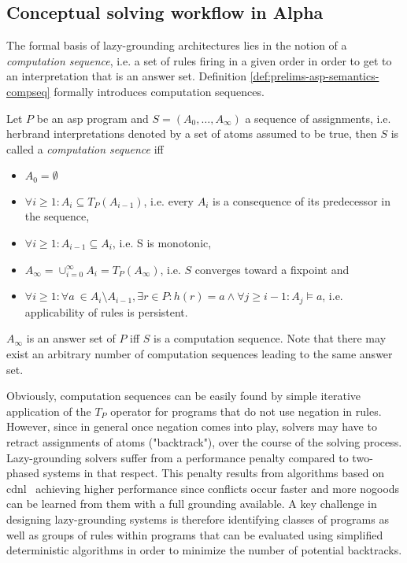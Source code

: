 \subsection{Conceptual solving workflow in Alpha}

The formal basis of lazy-grounding architectures lies in the notion of a \emph{computation sequence}, i.e. a set of rules firing in a given order in order to get to an interpretation that is an answer set. Definition \ref{def:prelims-asp-semantics-compseq} formally introduces computation sequences.

\begin{definition}
\label{def:prelims-asp-semantics-compseq}
Let $P$ be an \gls{asp} program and $S = (A_0,\ldots,A_{\infty})$ a sequence of assignments, i.e. herbrand interpretations denoted by a set of atoms assumed to be true, then $S$ is called a \emph{computation sequence} iff
\begin{itemize}
	\item $A_0 = \emptyset$
	\item $\forall i \geq 1: A_i \subseteq T_P(A_{i - 1})$, i.e. every $A_i$ is a consequence of its predecessor in the sequence,
	\item $\forall i \geq 1: A_{i - 1} \subseteq A_{i}$, i.e. S is monotonic,
	\item $A_{\infty} = \cup^{\infty}_{i = 0} A_i = T_P(A_{\infty})$, i.e. $S$ converges toward a fixpoint and
	\item $\forall i \geq 1: \forall a \ \in A_i \setminus A_{i - 1}, \exists r \in P: h(r) = a \land \forall j \geq i - 1: A_j \models a$, i.e. applicability of rules is persistent.
\end{itemize}
$A_{\infty}$ is an answer set of $P$ iff $S$ is a computation sequence. Note that there may exist an arbitrary number of computation sequences leading to the same answer set.
\end{definition}

Obviously, computation sequences can be easily found by simple iterative application of the $T_P$ operator for programs that do not use negation in rules. However, since in general once negation comes into play, solvers may have to retract assignments of atoms ("backtrack"), over the course of the solving process.  Lazy-grounding solvers suffer from a performance penalty compared to two-phased systems in that respect. This penalty results from algorithms based on \gls{cdnl}~\cite{clasp-cdnl} achieving higher performance since conflicts occur faster and more nogoods can be learned from them with a full grounding available. A key challenge in designing lazy-grounding systems is therefore identifying classes of programs as well as groups of rules within programs that can be evaluated using simplified deterministic algorithms in order to minimize the number of potential backtracks.

